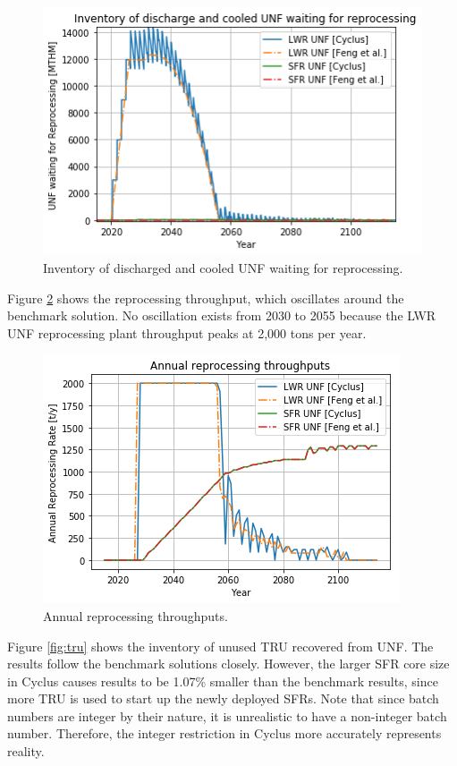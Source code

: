 \begin{figure}[htbp!]
	\begin{center}
		\includegraphics[scale=0.7]{./images/results_18/waiting_monthly.png}
	\end{center}
	\caption{Inventory of discharged and cooled \gls{UNF} waiting for reprocessing.}
	\label{fig:waiting_monthly}
\end{figure}


Figure \ref{fig:rep} shows the reprocessing throughput, which oscillates around
the benchmark solution. No oscillation exists from 2030 to 2055 because the
\gls{LWR} \gls{UNF} reprocessing plant throughput peaks at 2,000 tons per year.

\begin{figure}[htbp!]
	\begin{center}
		\includegraphics[scale=0.7]{./images/results_18/rep.png}
	\end{center}
	\caption{Annual reprocessing throughputs.}
	\label{fig:rep}
\end{figure}


Figure \ref{fig:tru} shows the inventory of unused \gls{TRU} recovered from \gls{UNF}.
The \Cyclus results follow the benchmark solutions closely. However,
the larger \gls{SFR} core size in Cyclus causes \Cyclus results to be 1.07\% smaller than the benchmark results,
since more \gls{TRU} is used to
start up the newly deployed \glspl{SFR}. Note that since
batch numbers are integer by their nature, it is unrealistic
to have a non-integer batch number. Therefore, the integer
restriction in Cyclus more accurately represents reality.

